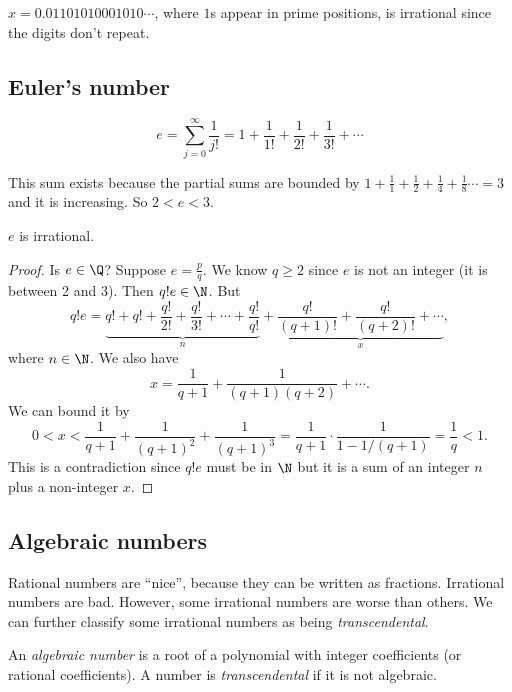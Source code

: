 \documentclass[a4paper]{article}
\begin{document}
\begin{eg}
  $x = 0.01101010001010\cdots$, where $1$s appear in prime positions, is irrational since the digits don't repeat.
\end{eg}
\subsection{Euler's number}
\begin{defi}
  \[
    e = \sum_{j=0}^\infty \frac{1}{j!} = 1 + \frac{1}{1!} + \frac{1}{2!} + \frac{1}{3!} + \cdots
  \]
\end{defi}
This sum exists because the partial sums are bounded by $1 + \frac{1}{1} + \frac{1}{2} + \frac{1}{4} + \frac{1}{8}\cdots = 3$ and it is increasing. So $2 < e < 3$.

\begin{prop}
  $e$ is irrational.
\end{prop}

\begin{proof}
  Is $e\in \Q$? Suppose $e = \frac{p}{q}$. We know $q\geq 2$ since $e$ is not an integer (it is between 2 and 3). Then $q!e \in \N$. But
  \[
    q!e = \underbrace{q! + q! + \frac{q!}{2!} + \frac{q!}{3!} + \cdots + \frac{q!}{q!}}_{n} + \underbrace{\frac{q!}{(q + 1)!} + \frac{q!}{(q + 2)!} + \cdots}_{x},
  \]
  where $n \in \N$. We also have
  \[
    x = \frac{1}{q + 1} + \frac{1}{(q + 1)(q + 2)} + \cdots.
  \]
  We can bound it by
  \[
    0 < x < \frac{1}{q+1} +\frac{1}{(q + 1)^2} + \frac{1}{(q + 1)^3} = \frac{1}{q + 1}\cdot \frac{1}{1 - 1/(q + 1)} = \frac{1}{q} < 1.
  \]
  This is a contradiction since $q!e$ must be in $\N$ but it is a sum of an integer $n$ plus a non-integer $x$.
\end{proof}

\subsection{Algebraic numbers}
Rational numbers are ``nice'', because they can be written as fractions. Irrational numbers are bad. However, some irrational numbers are worse than others. We can further classify some irrational numbers as being \emph{transcendental}.
\begin{defi}
  An \emph{algebraic number} is a root of a polynomial with integer coefficients (or rational coefficients). A number is \emph{transcendental} if it is not algebraic.
\end{defi}
\end{document}

